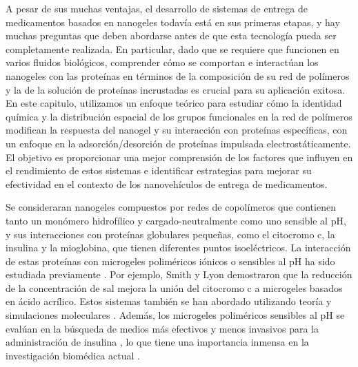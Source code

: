 A pesar de sus muchas ventajas, el desarrollo de sistemas de entrega de medicamentos basados en nanogeles todav\'ia est\'a en sus primeras etapas, y hay muchas preguntas que deben abordarse antes de que esta tecnolog\'ia pueda ser completamente realizada.
En particular, dado que se requiere que funcionen en varios fluidos biol\'ogicos, comprender c\'omo se comportan e interact\'uan los nanogeles con las prote\'inas en t\'erminos de la composici\'on de su red de pol\'imeros y la de la soluci\'on de prote\'inas incrustadas es crucial para su aplicaci\'on exitosa.
En este capitulo, utilizamos un enfoque te\'orico para estudiar c\'omo la identidad qu\'imica y la distribuci\'on espacial de los grupos funcionales en la red de pol\'imeros modifican la respuesta del nanogel y su interacci\'on con prote\'inas espec\'ificas, con un enfoque en la adsorci\'on/desorci\'on de prote\'inas impulsada electrost\'aticamente.
El objetivo es proporcionar una mejor comprensi\'on de los factores que influyen en el rendimiento de estos sistemas e identificar estrategias para mejorar su efectividad en el contexto de los nanoveh\'iculos de entrega de medicamentos.



Se consideraran  nanogeles compuestos por redes de copol\'imeros que contienen tanto un mon\'omero hidrof\'ilico y  cargado-neutralmente como uno sensible al pH, y sus interacciones con prote\'inas globulares peque\~nas, como el citocromo c, la insulina y la mioglobina, que tienen diferentes puntos isoel\'ectricos.
La interacci\'on de estas prote\'inas con microgeles polim\'ericos i\'onicos o sensibles al pH ha sido estudiada previamente \cite{kabanov2009nanogels,smith2011tunable,sharma2022modulating,klinger2011dual}.
Por ejemplo, Smith y Lyon \cite{smith2011tunable} demostraron que la reducci\'on de la concentraci\'on de sal mejora la uni\'on del citocromo c a microgeles basados en \'acido acr\'ilico.
Estos sistemas tambi\'en se han abordado utilizando teor\'ia y simulaciones moleculares \cite{hagemann2018use,oberle2015competitive}.
Adem\'as, los microgeles polim\'ericos sensibles al pH se eval\'uan en la b\'usqueda de medios m\'as efectivos y menos invasivos para la administraci\'on de insulina \cite{lowman1999oral,wong2018microparticles}, lo que tiene una importancia inmensa en la investigaci\'on biom\'edica actual \cite{chaturvedi2013polymeric} .


